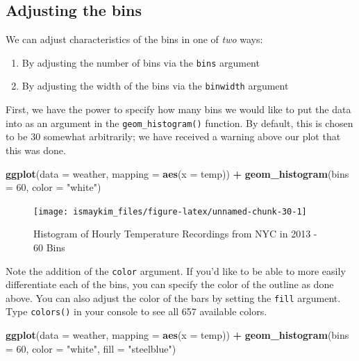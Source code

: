 \documentclass[12pt,]{krantz}
\makeatletter
\newenvironment{Shaded}{\begin{snugshade}}{\end{snugshade}}
\newcommand{\KeywordTok}[1]{\textcolor[rgb]{0.27,0.27,0.27}{\textbf{#1}}}
\newcommand{\DataTypeTok}[1]{\textcolor[rgb]{0.27,0.27,0.27}{#1}}
\newcommand{\DecValTok}[1]{\textcolor[rgb]{0.06,0.06,0.06}{#1}}
\newcommand{\StringTok}[1]{\textcolor[rgb]{0.5,0.5,0.5}{#1}}
\newcommand{\OperatorTok}[1]{\textcolor[rgb]{0.43,0.43,0.43}{\textbf{#1}}}
\newcommand{\NormalTok}[1]{#1}
\providecommand{\tightlist}{%
  \setlength{\itemsep}{0pt}\setlength{\parskip}{0pt}}
\newenvironment{kframe}{%
\medskip{}
\setlength{\fboxsep}{.8em}
 \def\at@end@of@kframe{}%
 \ifinner\ifhmode%
  \def\at@end@of@kframe{\end{minipage}}%
  \begin{minipage}{\columnwidth}%
 \fi\fi%
 \def\FrameCommand##1{\hskip\@totalleftmargin \hskip-\fboxsep
 \colorbox{shadecolor}{##1}\hskip-\fboxsep
     \hskip-\linewidth \hskip-\@totalleftmargin \hskip\columnwidth}%
 \MakeFramed {\advance\hsize-\width
   \@totalleftmargin\z@ \linewidth\hsize
   \@setminipage}}%
 {\par\unskip\endMakeFramed%
 \at@end@of@kframe}
\renewenvironment{Shaded}{\begin{kframe}}{\end{kframe}}
\theoremstyle{definition}
\theoremstyle{definition}
\theoremstyle{definition}
\theoremstyle{remark}
\makeatother
\begin{document}
\subsection{Adjusting the bins}\label{adjustbins}

We can adjust characteristics of the bins in one of \emph{two} ways:

\begin{enumerate}
\def\labelenumi{\arabic{enumi}.}
\tightlist
\item
  By adjusting the number of bins via the \texttt{bins} argument
\item
  By adjusting the width of the bins via the \texttt{binwidth} argument
\end{enumerate}

First, we have the power to specify how many bins we would like to put
the data into as an argument in the \texttt{geom\_histogram()} function.
By default, this is chosen to be 30 somewhat arbitrarily; we have
received a warning above our plot that this was done.

\begin{Shaded}
\begin{Highlighting}[]
\KeywordTok{ggplot}\NormalTok{(}\DataTypeTok{data =}\NormalTok{ weather, }\DataTypeTok{mapping =} \KeywordTok{aes}\NormalTok{(}\DataTypeTok{x =}\NormalTok{ temp)) }\OperatorTok{+}
\StringTok{  }\KeywordTok{geom_histogram}\NormalTok{(}\DataTypeTok{bins =} \DecValTok{60}\NormalTok{, }\DataTypeTok{color =} \StringTok{"white"}\NormalTok{)}
\end{Highlighting}
\end{Shaded}

\begin{figure}

{\centering \texttt{[image: ismaykim\_files/figure-latex/unnamed-chunk-30-1]} 

}

\caption{Histogram of Hourly Temperature Recordings from NYC in 2013 - 60 Bins}\label{fig:unnamed-chunk-30}
\end{figure}

Note the addition of the \texttt{color} argument. If you'd like to be
able to more easily differentiate each of the bins, you can specify the
color of the outline as done above. You can also adjust the color of the
bars by setting the \texttt{fill} argument. Type \texttt{colors()} in
your console to see all 657 available colors.

\begin{Shaded}
\begin{Highlighting}[]
\KeywordTok{ggplot}\NormalTok{(}\DataTypeTok{data =}\NormalTok{ weather, }\DataTypeTok{mapping =} \KeywordTok{aes}\NormalTok{(}\DataTypeTok{x =}\NormalTok{ temp)) }\OperatorTok{+}
\StringTok{  }\KeywordTok{geom_histogram}\NormalTok{(}\DataTypeTok{bins =} \DecValTok{60}\NormalTok{, }\DataTypeTok{color =} \StringTok{"white"}\NormalTok{, }\DataTypeTok{fill =} \StringTok{"steelblue"}\NormalTok{)}
\end{Highlighting}
\end{Shaded}
\end{document}
